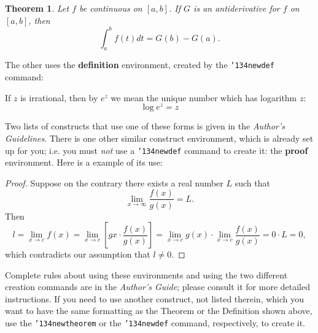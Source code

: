 \documentclass{sig-alternate-05-2015}
\begin{document}
\newtheorem{theorem}{Theorem}
\begin{theorem}
	Let $f$ be continuous on $[a,b]$.  If $G$ is an antiderivative for $f$ on $[a,b]$, then
	\begin{displaymath}
		\int^b_af(t)dt = G(b) - G(a).
	\end{displaymath}
\end{theorem}

The other uses the \textbf{definition} environment, created by the \texttt{{\char'134}newdef} command: 

\begin{definition}
	If $z$ is irrational, then by $e^z$ we mean the unique number which has logarithm $z$:
	\begin{displaymath}{\log e^z = z}\end{displaymath}
\end{definition}

Two lists of constructs that use one of these forms is given in the \textit{Author's  Guidelines}. There is one other similar construct environment, which is already set up for you; i.e. you must \textit{not} use a \texttt{{\char'134}newdef} command to create it: the \textbf{proof} environment.  Here is a example of its use:

\begin{proof}
	Suppose on the contrary there exists a real number $L$ such that
	\begin{displaymath}
		\lim_{x\rightarrow\infty} \frac{f(x)}{g(x)} = L.
	\end{displaymath}
	Then
	\begin{displaymath}
		l=\lim_{x\rightarrow c} f(x)
		= \lim_{x\rightarrow c}
		\left[ g{x} \cdot \frac{f(x)}{g(x)} \right ]
		= \lim_{x\rightarrow c} g(x) \cdot \lim_{x\rightarrow c}
		\frac{f(x)}{g(x)} = 0\cdot L = 0,
	\end{displaymath}
	which contradicts our assumption that $l\neq 0$.
\end{proof}

Complete rules about using these environments and using the two different creation commands are in the \textit{Author's Guide}; please consult it for more detailed instructions.  If you need to use another construct, not listed therein, which you want to have the same formatting as the Theorem or the Definition\cite{salas:calculus} shown above, use the \texttt{{\char'134}newtheorem} or the \texttt{{\char'134}newdef} command, respectively, to create it.
\end{document}
